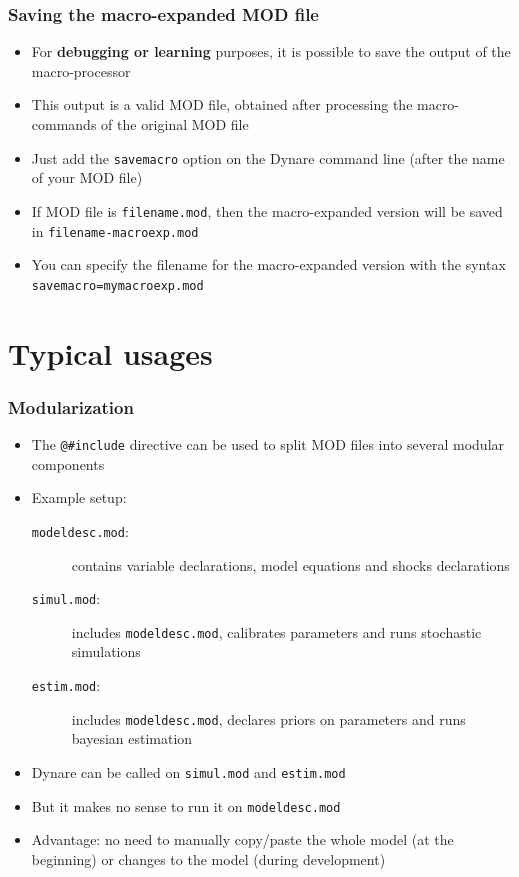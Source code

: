 \documentclass{beamer}
\begin{document}
\begin{frame}
  \frametitle{Saving the macro-expanded MOD file}
  \begin{itemize}
  \item For \textbf{debugging or learning} purposes, it is possible to save the output of the macro-processor
  \item This output is a valid MOD file, obtained after processing the macro-commands of the original MOD file
  \item Just add the \texttt{savemacro} option on the Dynare command line (after the name of your MOD file)
  \item If MOD file is \texttt{filename.mod}, then the macro-expanded version will be saved in \texttt{filename-macroexp.mod}
  \item You can specify the filename for the macro-expanded version with the syntax \texttt{savemacro=mymacroexp.mod}
  \end{itemize}
\end{frame}


\section{Typical usages}

\begin{frame}[fragile=singleslide]
  \frametitle{Modularization}
  \begin{itemize}
  \item The \verb+@#include+ directive can be used to split MOD files into several modular components
  \item Example setup:
    \begin{description}
    \item[\texttt{modeldesc.mod}:] contains variable declarations, model equations and shocks declarations
    \item[\texttt{simul.mod}:] includes \texttt{modeldesc.mod}, calibrates parameters and runs stochastic simulations
    \item[\texttt{estim.mod}:] includes \texttt{modeldesc.mod}, declares priors on parameters and runs bayesian estimation
    \end{description}
  \item Dynare can be called on \texttt{simul.mod} and \texttt{estim.mod}
  \item But it makes no sense to run it on \texttt{modeldesc.mod}
  \item Advantage: no need to manually copy/paste the whole model (at the beginning) or changes to the model (during development)
  \end{itemize}
\end{frame}
\end{document}
